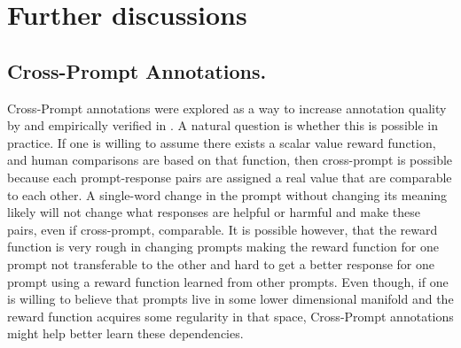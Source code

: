 \clearpage
\section{Further discussions}
\subsection{Cross-Prompt Annotations.}
\label{app:futherdisc}
Cross-Prompt annotations were explored as a way to increase annotation quality by \citet{sun2024rethinking} and empirically verified in \citet{yin2024relative}. A natural question is whether this is possible in practice. If one is willing to assume there exists a scalar value reward function, and human comparisons are based on that function, then cross-prompt is possible because each prompt-response pairs are assigned a real value that are comparable to each other. A single-word change in the prompt without changing its meaning likely will not change what responses are helpful or harmful and make these pairs, even if cross-prompt, comparable. It is possible however, that the reward function is very rough in changing prompts making the reward function for one prompt not transferable to the other and hard to get a better response for one prompt using a reward function learned from other prompts. Even though, if one is willing to believe that prompts live in some lower dimensional manifold and the reward function acquires some regularity in that space, Cross-Prompt annotations might help better learn these dependencies. 